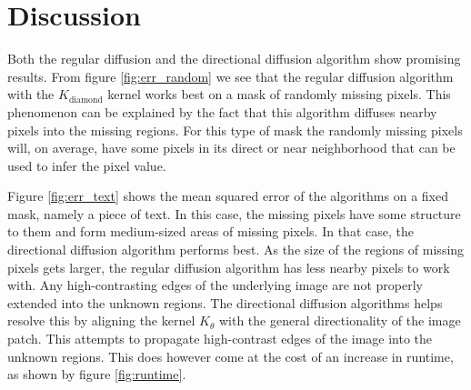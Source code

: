 \section{Discussion}
\label{sec:discussion}

Both the regular diffusion and the directional diffusion algorithm show promising results. From figure \ref{fig:err_random} we see that the regular diffusion algorithm with the $K_{\text{diamond}}$ kernel works best on a mask of randomly missing pixels. This phenomenon can be explained by the fact that this algorithm diffuses nearby pixels into the missing regions. For this type of mask the randomly missing pixels will, on average, have some pixels in its direct or near neighborhood that can be used to infer the pixel value.

Figure \ref{fig:err_text} shows the mean squared error of the algorithms on a fixed mask, namely a piece of text. In this case, the missing pixels have some structure to them and form medium-sized areas of missing pixels. In that case, the directional diffusion algorithm performs best. As the size of the regions of missing pixels gets larger, the regular diffusion algorithm has less nearby pixels to work with. Any high-contrasting edges of the underlying image are not properly extended into the unknown regions. The directional diffusion algorithms helps resolve this by aligning the kernel  $K_{\theta}$ with the general directionality of the image patch. This attempts to propagate high-contrast edges of the image into the unknown regions. This does however come at the cost of an increase in runtime, as shown by figure \ref{fig:runtime}.